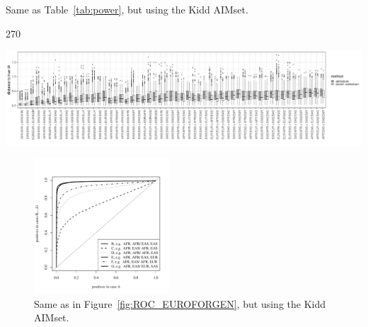 \documentclass[12pt]{article}
\theoremstyle{definition}
\begin{document}
\begin{table}[H]
  \centering
  
  \caption{Same as Table~\ref{tab:power}, but using the Kidd AIMset.}
  \label{tab:power_Kidd}
\end{table}

\begin{center}
  \begin{turn}{270}%
    \begin{minipage}{\textheight}
      \includegraphics[width=\textwidth]{deviations_mixed_allcases_Kidd.pdf}
      \label{fig:mixed_allcases_Kidd}
    \end{minipage}
  \end{turn}
\end{center}

\begin{figure}[H]
  \begin{center}
    \includegraphics[width=0.45\textwidth]{roc-curve-Kidd.pdf}
  \end{center}
  \caption{Same as in Figure~\ref{fig:ROC_EUROFORGEN}, but using the
    Kidd AIMset.}
  \label{fig:ROC_Kidd} 
\end{figure}
\end{document}
